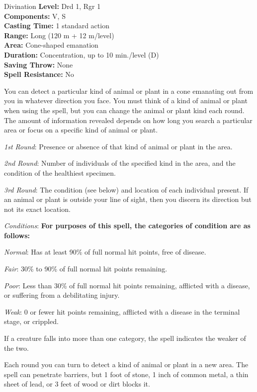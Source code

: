 {Divination}
{
	\textbf{Level:}
	Drd 1, Rgr 1\\
	\textbf{Components:}
	V, S\\
	\textbf{Casting Time:}
	1 standard action\\
	\textbf{Range:}
	Long (120 m + 12 m/level)\\
	\textbf{Area:}
	Cone-shaped emanation\\
	\textbf{Duration:}
	Concentration, up to 10 min./level (D)\\
	\textbf{Saving Throw:}
	None\\
	\textbf{Spell Resistance:}
	No\\
}
{
	You can detect a particular kind of animal or plant in a cone emanating out from you in whatever direction you face. You must think of a kind of animal or plant when using the spell, but you can change the animal or plant kind each round. The amount of information revealed depends on how long you search a particular area or focus on a specific kind of animal or plant.

	\textit{1st Round}:
	Presence or absence of that kind of animal or plant in the area.

	\textit{2nd Round}:
	Number of individuals of the specified kind in the area, and the condition of the healthiest specimen.

	\textit{3rd Round}:
	The condition (see below) and location of each individual present. If an animal or plant is outside your line of sight, then you discern its direction but not its exact location.

	\textit{Conditions}:
	\textbf{	For purposes of this spell, the categories of condition are as follows:}

	\textit{Normal}:
	Has at least 90\% of full normal hit points, free of disease.

	\textit{Fair}:
	30\% to 90\% of full normal hit points remaining.

	\textit{Poor}:
	Less than 30\% of full normal hit points remaining, afflicted with a disease, or suffering from a debilitating injury.

	\textit{Weak}:
	0 or fewer hit points remaining, afflicted with a disease in the terminal stage, or crippled.

	If a creature falls into more than one category, the spell indicates the weaker of the two.

	Each round you can turn to detect a kind of animal or plant in a new area. The spell can penetrate barriers, but 1 foot of stone, 1 inch of common metal, a thin sheet of lead, or 3 feet of wood or dirt blocks it.

}

